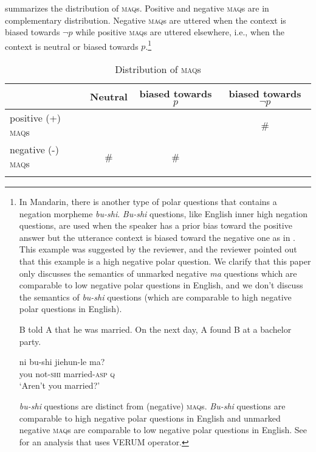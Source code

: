 \documentclass[output=paper,colorlinks,citecolor=brown]{langscibook}
\begin{document}
 summarizes the distribution of \textsc{maq}s.  Positive and negative \textsc{maq}s are in complementary distribution.  Negative \textsc{maq}s are uttered when the context is biased towards $\neg p$ while positive \textsc{maq}s  are uttered elsewhere, i.e., when the context is neutral or biased towards $p$.\footnote{In Mandarin, there is another type of polar questions that contains a negation morpheme \emph{bu-shi}.  
\emph{Bu-shi} questions, like English inner high negation questions, are used when the speaker has a prior bias toward the positive answer but the utterance context is biased toward the negative one as in . This example was suggested by the reviewer, and the reviewer pointed out that this example is a high negative polar question. We clarify that this paper only discusses the semantics of unmarked negative \textit{ma} questions which are comparable to low negative polar questions in English, and we don't discuss the semantics of \textit{bu-shi} questions (which are comparable to high negative polar questions in English).

\begin{exe}
\ex\label{married}  B told A that he was married. On the next day, A found B at a bachelor party.
 \begin{xlist}
   \gll ni bu-shi jiehun-le ma?  \\
 you not-\textsc{shi} married-\textsc{asp} \textsc{q}\\
 \glt `Aren't you married?'
\end{xlist}
\end{exe}
 

\textit{bu-shi} questions are distinct from (negative) \textsc{maq}s. \textit{Bu-shi} questions are comparable to high negative polar questions in English and unmarked negative \textsc{maq}s are comparable to low negative polar questions in English. See \citet{Fu2021} for an analysis that uses  VERUM operator.}

\begin{table}
  \begin{tabularx}{\textwidth}{lCcc}
  \lsptoprule
  	&  Neutral  & biased towards  $p$ & biased towards $\neg p$\\
\midrule
	positive (+) \textsc{maq}s & \cmark & \cmark & \#\\
	negative (-) \textsc{maq}s & \# & \# & \cmark\\
\lspbottomrule
\end{tabularx}
\caption{Distribution of \textsc{maq}s}
\label{matable1}
\end{table}
\end{document}
